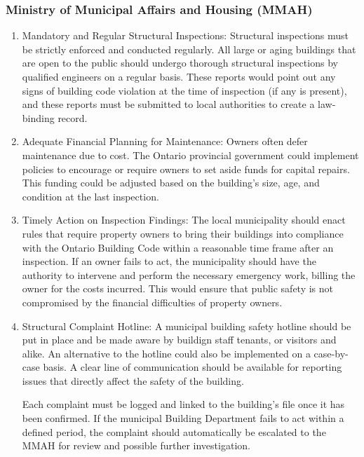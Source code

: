 \documentclass[12pt]{article}
\begin{document}
\subsubsection{Ministry of Municipal Affairs and Housing (MMAH)}
\begin{enumerate}
    \item Mandatory and Regular Structural Inspections: Structural inspections must be strictly enforced and conducted regularly. All large or aging buildings that are open to the public should undergo thorough structural inspections by qualified engineers on a regular basis. These reports would point out any signs of building code violation at the time of inspection (if any is present), and these reports must be submitted to local authorities to create a law-binding record.

    \item Adequate Financial Planning for Maintenance: Owners often defer maintenance due to cost. The Ontario provincial government could implement policies to encourage or require owners to set aside funds for capital repairs. This funding could be adjusted based on the building's size, age, and condition at the last inspection.

    \item Timely Action on Inspection Findings: The local municipality should enact rules that require property owners to bring their buildings into compliance with the Ontario Building Code within a reasonable time frame after an inspection. If an owner fails to act, the municipality should have the authority to intervene and perform the necessary emergency work, billing the owner for the costs incurred. This would ensure that public safety is not compromised by the financial difficulties of property owners.
    
    \item Structural Complaint Hotline: A municipal building safety hotline should be put in place and be made aware by buildign staff tenants, or visitors and alike. An alternative to the hotline could also be implemented on a case-by-case basis. A clear line of communication should be available for reporting issues that directly affect the safety of the building.
    
    Each complaint must be logged and linked to the building's file once it has been confirmed. If the municipal Building Department fails to act within a defined period, the complaint should automatically be escalated to the MMAH for review and possible further investigation.
\end{enumerate}
\end{document}
